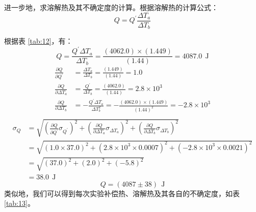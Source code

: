 \documentclass[cn,hazy,pku,12pt,normal,math=newtx,cite=super]{elegantnote}
\begin{document}
进一步地，求溶解热及其不确定度的计算。根据溶解热的计算公式：
\begin{equation*}
    Q = Q^\prime \frac{\Delta T_a}{\Delta T_b}
\end{equation*}

根据表 \ref{tab:12}，有：
\begin{equation*}
Q=\frac{Q^\prime \Delta T_a}{\Delta T_b}=\frac{\left(4062.0\right) \times \left(1.449\right)}{\left(1.44\right)}=4087.0\ \mathrm{~J}
\end{equation*}
\begin{equation*}
\begin{aligned}
\frac{\partial Q }{\partial Q^\prime }&=\frac{\Delta T_a}{\Delta T_b}=\frac{\left(1.449\right)}{\left(1.44\right)}=1.0\\
\frac{\partial Q }{\partial \Delta T_a }&=\frac{Q^\prime}{\Delta T_b}=\frac{\left(4062.0\right)}{\left(1.44\right)}=2.8 \times 10^{3}\\
\frac{\partial Q }{\partial \Delta T_b }&=- \frac{Q^\prime \Delta T_a}{\Delta T_b^{2}}=- \frac{\left(4062.0\right) \times \left(1.449\right)}{\left(1.44\right)^{2}}=-2.8 \times 10^{3}\\
\end{aligned}
\end{equation*}
\begin{equation*}
\begin{aligned}
\sigma_{Q}&=\sqrt{\left(\frac{\partial Q }{\partial Q^\prime } \sigma_{Q^\prime}\right)^2+\left(\frac{\partial Q }{\partial \Delta T_a } \sigma_{\Delta T_a}\right)^2+\left(\frac{\partial Q }{\partial \Delta T_b } \sigma_{\Delta T_b}\right)^2}\\
&=\sqrt{\left(1.0 \times 37.0\right)^2+\left(2.8 \times 10^{3} \times 0.0007\right)^2+\left(-2.8 \times 10^{3} \times 0.0021\right)^2}\\
&=\sqrt{\left(37.0\right)^2+\left(2.0\right)^2+\left(-5.8\right)^2}\\
&=38.0\ \mathrm{~J}
\end{aligned}
\end{equation*}
\begin{equation*}
Q=\left (4087 \pm 38 \right )\ \mathrm{~J}
\end{equation*}
类似地，我们可以得到每次实验补偿热、溶解热及其各自的不确定度，如表 \ref{tab:13}。
\end{document}
